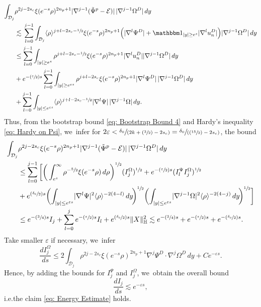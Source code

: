\documentclass[10pt]{article}
\newcommand{\ie}{i.e.}
\newcommand{\Psfrac}[2]{(\sfrac{#1}{#2})}
\newcommand{\spfrac}[2]{\sfrac{#1}{(#2)}}
\theoremstyle{plain}
\theoremstyle{definition}
\begin{document}
\[
\begin{aligned}
\int_{\mathcal D_j} &\rho^{2j-2s_c}\xi(e^{-s}\rho)^{2n_p+1}|\nabla^{j-1}(\tilde \Psi^p-\mathcal E)|\,|\nabla^{j-1}\Omega^D|\,dy\\
&\lesssim\,\sum_{l=0}^{j-1}\int_{\mathcal D_j} \langle\rho\rangle^{j+l-2s_c-\sfrac{1}{2}}\xi(e^{-s}\rho)^{2n_p+1}\Big(|\nabla^l\Psi^D|+\mathbbm 1_{|y|\ge e^s}|\nabla^l u_n^D|\Big)|\nabla^{j-1}\Omega^D|\,dy\\
&\le  \sum_{l=0}^{j-1}\int_{|y|\ge e^s} \rho^{j+l-2s_c-\sfrac{1}{2}}\xi(e^{-s}\rho)^{2n_p+1}|\nabla^lu_n^D||\nabla^{j-1}\Omega^D|\,dy\\
&+e^{-\Psfrac{\varepsilon}{2} s}\sum_{l=0}^{j-1}\int_{|y|\ge e^{\varepsilon s}} \rho^{j+l-2s_c}\xi(e^{-s}\rho)^{2n_p+1}|\nabla^l \Psi^D |\,|\nabla^{j-1}\Omega^D|\,dy\\
&+\sum_{l=0}^{j-1}\int_{|y|\le e^{\varepsilon s}} \langle\rho\rangle^{j+l-2s_c-\sfrac{1}{2}}|\nabla^l\Psi |\,|\nabla^{j-1}\Omega|\,dy.
\end{aligned}
\]
Thus, from the bootstrap bound \eqref{eq: Bootstrap Bound 4} and Hardy's inequality \eqref{eq: Hardy on Psi}, we~infer for $2\varepsilon<\spfrac{\delta_0}{2k+\Psfrac32-2s_c}=\spfrac{\delta_0}{\Psfrac{15}{2}-2s_c}$, the bound
\[
\begin{aligned}
\int_{\mathcal D_j}& \rho^{2j-2s_c}\xi(e^{-s}\rho)^{2n_p+1}|\nabla^{j-1}(\tilde \Psi^p-\mathcal E)|\,|\nabla^{j-1}\Omega^D|\,dy\\
&\le \sum_{l=0}^{j-1}\bigg[\bigg(\int_{e^s}^\infty \rho^{-\sfrac52}\xi(e^{-s}\rho)\,d\rho\bigg)^{\sfrac{1}{2}}(I_j^\Omega)^{\sfrac12}+e^{-\Psfrac{\varepsilon}{2} s}(I_l^\Psi I_j^\Omega)^{\sfrac{1}{2}}\\
&+e^{\Psfrac{\delta_0}{2} s}\bigg(\!\int_{|y|\le e^{\varepsilon s}}\!|\nabla^l \Psi |^2\langle\rho\rangle^{-2(4-l)}\,dy\!\bigg)^{\sfrac{1}{2}}\bigg(\!\int_{|y|\le e^{\varepsilon s}}\! |\nabla^{j-1}\Omega|^2\langle\rho\rangle^{-2(4-j)}\,dy\!\bigg)^{\sfrac{1}{2}}\bigg]\\
&\le e^{-\Psfrac34 s}I_j+\sum_{l=0}^j e^{-\Psfrac{\varepsilon}{2} s} I_l+e^{\Psfrac{\delta_0}{2}s}\Vert X\Vert_{\mathbb H}^2\lesssim e^{-\Psfrac34 s}+ e^{-\Psfrac{\varepsilon}{2} s}+e^{-\Psfrac{\delta_0}{2}s}.
\end{aligned}
\]
Take smaller $\varepsilon$ if necessary, we~infer
\[
\frac{dI_j^\Omega}{ds}\le 2\int_{\mathcal D_j} \rho^{2j-2s_c}\xi(e^{-s}\rho)^{2n_p+1}\nabla^j\Psi^D\cdot\nabla^j\Omega^D\,dy+C e^{-\varepsilon s}.
\]
Hence, by adding the bounds for $I_j^\Psi$ and $I_j^\Omega$, we~obtain the overall bound
\begin{equation}
\label{eq: Case 1 Energy Estimate}
\frac{dI_j}{ds} \lesssim e^{-\varepsilon s},
\end{equation}
\ie the claim \eqref{eq: Energy Estimate} holds.
\end{document}
